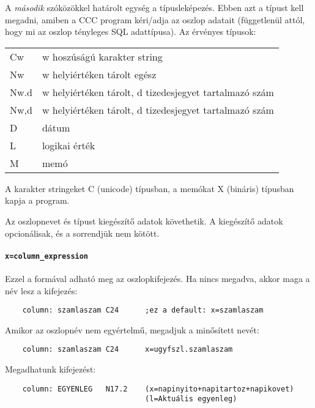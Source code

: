     A {\em második\/} szóközökkel határolt egység a típusleképezés.
    Ebben azt a típust kell megadni, amiben a CCC program 
    kéri/adja az oszlop adatait (függetlenül attól, hogy
    mi az oszlop tényleges SQL adattípusa). Az érvényes típusok:

    \begin{centering}    
    \begin{tabular}{l@{:~~}l}
        Cw   &  w hoszúságú karakter string \\
        Nw   &  w helyiértéken tárolt egész \\
        Nw.d &  w helyiértéken tárolt, d tizedesjegyet tartalmazó szám \\
        Nw,d &  w helyiértéken tárolt, d tizedesjegyet tartalmazó szám \\
        D    &  dátum \\
        L    &  logikai érték \\
        M    &  memó \\
    \end{tabular}
    \end{centering}    

    A karakter stringeket C (unicode) típusban, a memókat X (bináris)
    típusban kapja a program.

    Az oszlopnevet és típust kiegészítő adatok követhetik.    
    A kiegészítő adatok opcionálisak, és a sorrendjük nem kötött.
    

\paragraph{\tt x=column\_expression}
    
Ezzel a formával adható meg az oszlopkifejezés. 
Ha nincs megadva, akkor maga a név lesz a kifejezés:
\begin{verbatim}
    column: szamlaszam C24      ;ez a default: x=szamlaszam
\end{verbatim}

Amikor az oszlopnév nem egyértelmű, megadjuk a minősített nevét:
\begin{verbatim}
    column: szamlaszam C24      x=ugyfszl.szamlaszam
\end{verbatim}

Megadhatunk kifejezést:
\begin{verbatim}
    column: EGYENLEG   N17.2    (x=napinyito+napitartoz+napikovet)
                                (l=Aktuális egyenleg)
\end{verbatim}

